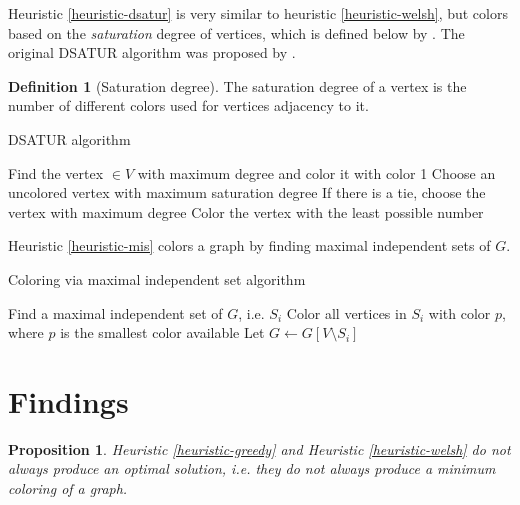 \documentclass{article}
\newcounter{heuristic} \setcounter{heuristic}{0}
\newtheorem{prop}{Proposition}
\theoremstyle{definition}
\newtheorem{definition}{Definition}
\begin{document}
\heuristic{}\label{heuristic-dsatur}

Heuristic \ref{heuristic-dsatur} is very similar to heuristic \ref{heuristic-welsh}, but colors based on the \emph{saturation} degree of vertices, which is defined below by \cite{spinrad}. The original DSATUR algorithm was proposed by \cite{brelaz}.

\begin{definition}[Saturation degree]
The saturation degree of a vertex is the number of different colors used for vertices adjacency to it.
\end{definition}

\begin{algorithm}
\caption{DSATUR algorithm}
\begin{algorithmic}[1]
\State Find the vertex $\in V$ with maximum degree and color it with color 1
\State Choose an uncolored vertex with maximum saturation degree
\State If there is a tie, choose the vertex with maximum degree
\State Color the vertex with the least possible number
\EndWhile
\end{algorithmic}
\end{algorithm}

\newpage

\heuristic{}\label{heuristic-mis}

Heuristic \ref{heuristic-mis} colors a graph by finding maximal independent sets of \(G\).

\begin{algorithm}
\caption{Coloring via maximal independent set algorithm}
\begin{algorithmic}[1]
\State Find a maximal independent set of $G$, i.e. $S_i$
\State Color all vertices in $S_i$ with color $p$, where $p$ is the smallest color available
\State Let $G \leftarrow G[V \setminus S_i ] $
\EndWhile
\end{algorithmic}
\end{algorithm}

\section*{Findings}

\begin{prop}
Heuristic \ref{heuristic-greedy} and Heuristic \ref{heuristic-welsh} do not always produce an optimal solution, i.e. they do not always produce a minimum coloring of a graph.
\end{prop}
\end{document}
